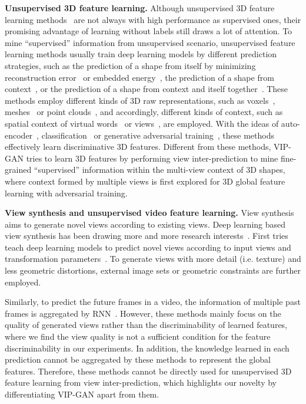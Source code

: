 \documentclass[letterpaper]{article} \usepackage{aaai19}  \usepackage{times}  \usepackage{helvet}  \usepackage{courier}  \usepackage{url}  \usepackage{graphicx}
\begin{document}
\noindent\textbf{Unsupervised 3D feature learning. }Although unsupervised 3D feature learning methods~\cite{Sharma16,WuNIPS2016,Zhizhong2016b,Girdhar16,RezendeEMBJH16,YaoqingCVPR2018,PanosCVPR2018ICML,HanTIP18} are not always with high performance as supervised ones, their promising advantage of learning without labels still draws a lot of attention. To mine ``supervised'' information from unsupervised scenario, unsupervised feature learning methods usually train deep learning models by different prediction strategies, such as the prediction of a shape from itself by minimizing reconstruction error~\cite{Sharma16,WuNIPS2016,YaoqingCVPR2018,PanosCVPR2018ICML} or embedded energy~\cite{Zhizhong2016b}, the prediction of a shape from context~\cite{HanTIP18}, or the prediction of a shape from context and itself together~\cite{Girdhar16,RezendeEMBJH16}. These methods employ different kinds of 3D raw representations, such as voxels~\cite{Sharma16,WuNIPS2016,Girdhar16,RezendeEMBJH16}, meshes~\cite{Zhizhong2016b,HanTIP18} or point clouds~\cite{YaoqingCVPR2018,PanosCVPR2018ICML}, and accordingly, different kinds of context, such as spatial context of virtual words~\cite{HanTIP18} or views~\cite{Girdhar16,RezendeEMBJH16}, are employed. With the ideas of auto-encoder~\cite{Sharma16,Girdhar16,RezendeEMBJH16,YaoqingCVPR2018,PanosCVPR2018ICML}, classification~\cite{HanTIP18} or generative adversarial training~\cite{WuNIPS2016,PanosCVPR2018ICML}, these methods effectively learn discriminative 3D features. Different from these methods, VIP-GAN tries to learn 3D features by performing view inter-prediction to mine fine-grained ``supervised'' information within the multi-view context of 3D shapes, where context formed by multiple views is first explored for 3D global feature learning with adversarial training.

\noindent\textbf{View synthesis and unsupervised video feature learning. }View synthesis aims to generate novel views according to existing views. Deep learning based view synthesis has been drawing more and more research interests~\cite{TatarchenkoDB16,WilliamICLR17}. First tries teach deep learning models to predict novel views according to input views and transformation parameters~\cite{TatarchenkoDB16}. To generate views with more detail (i.e. texture) and less geometric distortions, external image sets or geometric constraints are further employed.

Similarly, to predict the future frames in a video, the information of multiple past frames is aggregated by RNN~\cite{WilliamICLR17}. However, these methods mainly focus on the quality of generated views rather than the discriminability of learned features, where we find the view quality is not a sufficient condition for the feature discriminability in our experiments. In addition, the knowledge learned in each prediction cannot be aggregated by these methods to represent the global features. Therefore, these methods cannot be directly used for unsupervised 3D feature learning from view inter-prediction, which highlights our novelty by differentiating VIP-GAN apart from them.
\end{document}
